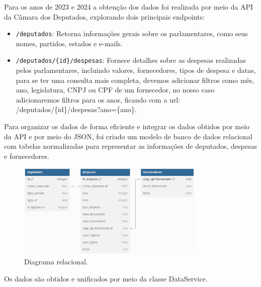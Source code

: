 \documentclass[12pt, a4paper]{article}
\begin{document}
Para os anos de 2023 e 2024 a obtenção dos dados foi realizada por meio da API\cite{dados_abertos} da Câmara dos Deputados, explorando dois principais endpoints:
\begin{itemize}
    \item \texttt{/deputados}: Retorna informações gerais sobre os parlamentares, como seus nomes, partidos, estados e e-mails.
    \item \texttt{/deputados/\{id\}/despesas}: Fornece detalhes sobre as despesas realizadas pelos parlamentares, incluindo valores, fornecedores, tipos de despesa e datas, para se ter uma consulta mais completa, devemos adicionar filtros como mês, ano, legislatura, CNPJ ou CPF de um fornecedor, no nosso caso adicionaremos filtros para os anos, ficando com a url: /deputados/\{id\}/despesas?ano=\{ano\}.
\end{itemize}

Para organizar os dados de forma eficiente e integrar os dados obtidos por meio da API e por meio do JSON, foi criado um modelo de banco de dados relacional com tabelas normalizadas para representar as informações de deputados, despesas e fornecedores\cite{dbdiagram}.

\begin{figure}[htbp]
	\centering
	\includegraphics[width=0.8\textwidth]{assets/1_dbdiagram.png}
	\caption{Diagrama relacional.}
	\label{fig:arquivo_json}
\end{figure}
\newpage

Os dados são obtidos e unificados por meio da classe DataService.
\end{document}
